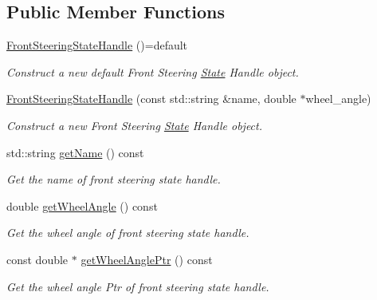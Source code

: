 \subsection*{Public Member Functions}
\begin{DoxyCompactItemize}
\item 
\mbox{\label{classhardware__interface_1_1FrontSteeringStateHandle_a9a958aa02769befbceafb6cb80161887}} 
\hyperlink{classhardware__interface_1_1FrontSteeringStateHandle_a9a958aa02769befbceafb6cb80161887}{Front\+Steering\+State\+Handle} ()=default
\begin{DoxyCompactList}\small\item\em Construct a new default Front Steering \hyperlink{structState}{State} Handle object. \end{DoxyCompactList}\item 
\hyperlink{classhardware__interface_1_1FrontSteeringStateHandle_a66c35f84be02411cc10bbf78b40cab0d}{Front\+Steering\+State\+Handle} (const std\+::string \&name, double $\ast$wheel\+\_\+angle)
\begin{DoxyCompactList}\small\item\em Construct a new Front Steering \hyperlink{structState}{State} Handle object. \end{DoxyCompactList}\item 
std\+::string \hyperlink{classhardware__interface_1_1FrontSteeringStateHandle_af3e7e4b83211f176051cad32b5640654}{get\+Name} () const
\begin{DoxyCompactList}\small\item\em Get the name of front steering state handle. \end{DoxyCompactList}\item 
double \hyperlink{classhardware__interface_1_1FrontSteeringStateHandle_abd7644f5da7a0808906a35e2edad9d3f}{get\+Wheel\+Angle} () const
\begin{DoxyCompactList}\small\item\em Get the wheel angle of front steering state handle. \end{DoxyCompactList}\item 
const double $\ast$ \hyperlink{classhardware__interface_1_1FrontSteeringStateHandle_a5a7485884313106a02911a7c9016fe0d}{get\+Wheel\+Angle\+Ptr} () const
\begin{DoxyCompactList}\small\item\em Get the wheel angle Ptr of front steering state handle. \end{DoxyCompactList}\end{DoxyCompactItemize}


